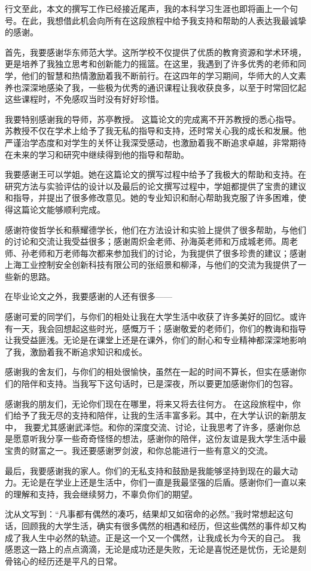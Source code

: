 \begin{acknowledgement}
行文至此，本文的撰写工作已经接近尾声，我的本科学习生涯也即将画上一个句号。在此，我想借此机会向所有在这段旅程中给予我支持和帮助的人表达我最诚挚的感谢。

首先，我要感谢华东师范大学。这所学校不仅提供了优质的教育资源和学术环境，更是培养了我独立思考和创新能力的摇篮。在这里，我遇到了许多优秀的老师和同学，他们的智慧和热情激励着我不断前行。在这四年的学习期间，华师大的人文素养也深深地感染了我，一些极为优秀的通识课程让我收获良多，以至于时常回忆起这些课程时，不免感叹当时没有好好珍惜。

我要特别感谢我的导师，苏亭教授。
这篇论文的完成离不开苏教授的悉心指导。
苏教授不仅在学术上给予了我无私的指导和支持，还时常关心我的成长和发展。他严谨治学态度和对学生的关怀让我深受感动，也激励着我不断追求卓越，非常期待在未来的学习和研究中继续得到他的指导和帮助。

我要感谢王可以学姐。她在这篇论文的撰写过程中给予了我极大的帮助和支持。在研究方法与实验评估的设计以及最后的论文撰写过程中，学姐都提供了宝贵的建议和指导，并提出了很多修改意见。她的专业知识和耐心帮助我克服了许多困难，使得这篇论文能够顺利完成。

感谢符俊哲学长和蔡耀德学长，他们在方法设计和实验上提供了很多帮助，与他们的讨论和交流让我受益很多；感谢周炽金老师、孙海英老师和万成城老师。周老师、孙老师和万老师每次都来参加我们的讨论，为我提供了很多珍贵的建议；感谢上海工业控制安全创新科技有限公司的张绍景和柳泽，与他们的交流为我提供了一些新的思路。

在毕业论文之外，我要感谢的人还有很多——

感谢可爱的同学们，与你们的相处让我在大学生活中收获了许多美好的回忆。或许有一天，我会回想起这些时光，感慨万千；感谢敬爱的老师们，你们的教诲和指导让我受益匪浅。无论是在课堂上还是在课外，你们的耐心和专业精神都深深地影响了我，激励着我不断追求知识和成长。

感谢我的舍友们，与你们的相处很愉快，虽然在一起的时间不算长，但实在感谢你们的陪伴和支持。当我写下这句话时，已是深夜，所以要更加感谢你们的包容。

感谢我的朋友们，无论你们现在在哪里，将来又将去往何方。
在这段旅程中，你们给予了我无尽的支持和陪伴，让我的生活丰富多彩。其中，在大学认识的新朋友中，
我要尤其感谢武泽恺。和你的深度交流、讨论，让我思考了许多，感谢你总是愿意听我分享一些奇奇怪怪的想法，感谢你的陪伴，这份友谊是我大学生活中最宝贵的财富之一。我还要感谢罗剑波，和你总能进行一些有意义的交流。

最后，我要感谢我的家人。你们的无私支持和鼓励是我能够坚持到现在的最大动力。无论是在学业上还是生活中，你们一直是我最坚强的后盾。感谢你们一直以来的理解和支持，我会继续努力，不辜负你们的期望。

沈从文写到：“凡事都有偶然的凑巧，结果却又如宿命的必然。”我时常想起这句话，回顾我的大学生活，确实有很多偶然的相遇和经历，但这些偶然的事件却又构成了我人生中必然的轨迹。正是这一个又一个偶然，让我成长为今天的自己。
我感恩这一路上的点点滴滴，无论是成功还是失败，无论是喜悦还是忧伤，无论是刻骨铭心的经历还是平凡的日常。
\end{acknowledgement}